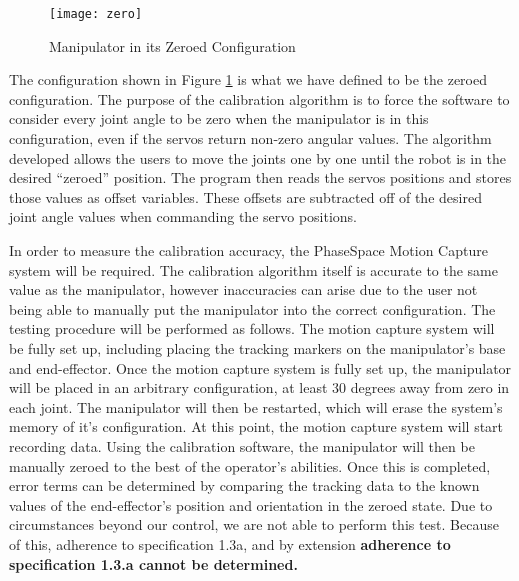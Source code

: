 \begin{figure}[htp]
  \centering
  \texttt{[image: zero]}
  \caption{Manipulator in its Zeroed Configuration}
  \label{fig:zero}
\end{figure}

The configuration shown in Figure \ref{fig:zero} is what we have defined to be the zeroed configuration. The purpose of the calibration algorithm is to force the software to consider every joint angle to be zero when the manipulator is in this configuration, even if the servos return non-zero angular values. The algorithm developed allows the users to move the joints one by one until the robot is in the desired “zeroed” position. The program then reads the servos positions and stores those values as offset variables. These offsets are subtracted off of the desired joint angle values when commanding the servo positions.

In order to measure the calibration accuracy, the PhaseSpace Motion Capture system will be required. The calibration algorithm itself is accurate to the same value as the manipulator, however inaccuracies can arise due to the user not being able to manually put the manipulator into the correct configuration.  The testing procedure will be performed as follows. The motion capture system will be fully set up, including placing the tracking markers on the manipulator’s base and end-effector. Once the motion capture system is fully set up, the manipulator will be placed in an arbitrary configuration, at least 30 degrees away from zero in each joint. The manipulator will then be restarted, which will erase the system’s memory of it’s configuration. At this point, the motion capture system will start recording data. Using the calibration software, the manipulator will then be manually zeroed to the best of the operator’s abilities. Once this is completed, error terms can be determined by comparing the tracking data to the known values of the end-effector’s position and orientation in the zeroed state. Due to circumstances beyond our control, we are not able to perform this test. Because of this, adherence to specification 1.3a, and by extension \textbf{adherence to specification 1.3.a cannot be determined.}

